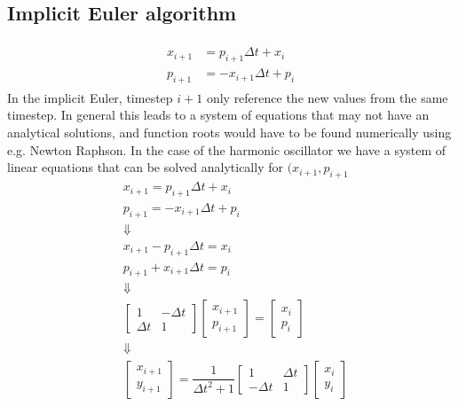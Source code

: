 \subsection{Implicit Euler algorithm}
\begin{align}
\begin{split}
x_{i+1} &= p_{i+1}\Delta t + x_i \\
p_{i+1} &= -x_{i+1}\Delta t + p_i
\end{split}
\end{align}
In the implicit Euler, timestep $i+1$ only reference the new values from the same timestep. In general this leads to a system of equations that may not have an analytical solutions, and function roots would have to be found numerically using e.g. Newton Raphson. In the case of the harmonic oscillator we have a system of linear equations that can be solved analytically for $(x_{i+1},p_{i+1}$
\begin{align}
\nonumber &x_{i+1} = p_{i+1}\Delta t + x_i \\
\nonumber &p_{i+1} = -x_{i+1}\Delta t + p_i \\[0.4cm]
\nonumber & \Downarrow \\[0.4cm]
\nonumber &x_{i+1} - p_{i+1}\Delta t = x_i \\
\nonumber &p_{i+1} + x_{i+1}\Delta t = p_i \\[0.4cm]
\nonumber &\Downarrow \\[0.4cm]
\nonumber &\begin{bmatrix}
  1 & -\Delta t \\
  \Delta t & 1
\end{bmatrix}
\begin{bmatrix}
  x_{i+1} \\
  p_{i+1}
\end{bmatrix}
= \begin{bmatrix}
  x_i \\
  p_i
\end{bmatrix} \\[0.4cm]
\nonumber &\Downarrow \\[0.4cm]
&\begin{bmatrix} \label{al:ho-euler_i}
  x_{i+1} \\
  y_{i+1}
\end{bmatrix}
= \dfrac{1}{{\Delta t}^2 + 1}
\begin{bmatrix}
  1 & \Delta t \\
  -\Delta t & 1
\end{bmatrix}
\begin{bmatrix}
  x_i \\
  y_i
\end{bmatrix}
\end{align}

